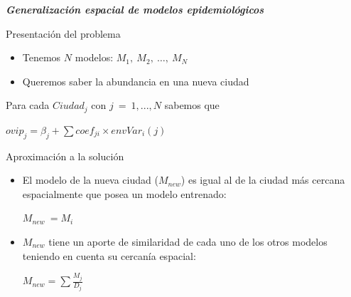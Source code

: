 \documentclass[10pt]{beamer}
\newcommand\IncrFont{\fontsize{20}{20}\selectfont}
\begin{document}
\begin{frame}{}
  \IncrFont
  \begin{center}
    \textit{\textbf{Generalización espacial de modelos epidemiológicos}}
  \end{center}
\end{frame}


\begin{frame}{Presentación del problema}
  \begin{itemize}[<+->]
    \item Tenemos $N$ modelos: $M_{1},\ M_{2},\ \dots,\ M_{N}$
    \item Queremos saber la abundancia en una nueva ciudad
  \end{itemize}
  \pause

  Para cada $Ciudad_{j}$ con $j\ =\ 1, ..., N$ sabemos que
  \begin{center}
    $ovip_{j} = \beta_{j} + \sum{}{coef_{ji} \times envVar_{i}(j)}$
  \end{center}
\end{frame}



\begin{frame}{Aproximación a la solución}
  \begin{itemize}[<+->]
    \item El modelo de la nueva ciudad ($M_{new}$) es igual al de la ciudad más
          cercana espacialmente que posea un modelo entrenado:
          \begin{center}
            $M_{new}\ = M_{i}$
          \end{center}
    \item $M_{new}$ tiene un aporte de similaridad de cada uno de los otros modelos
          teniendo en cuenta su cercanía espacial:
          \begin{center}
            $M_{new} = \sum{}{\frac{M_{j}}{D_{j}}}$
          \end{center}
  \end{itemize}
\end{frame}
\end{document}
